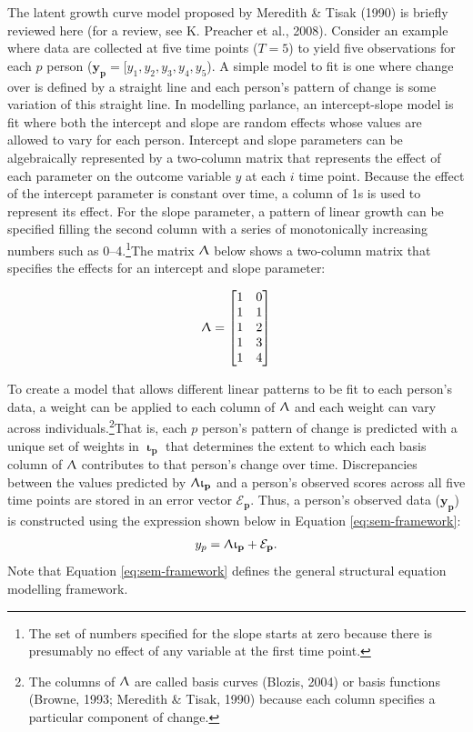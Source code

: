 \documentclass[
12pt, %
twoside,
english]{guelphthesis}
\theoremstyle{definition}
\theoremstyle{definition}
\theoremstyle{definition}
\theoremstyle{definition}
\theoremstyle{remark}
\begin{document}
The latent growth curve model proposed by Meredith \& Tisak (1990)
is briefly reviewed here (for a review, see K. Preacher et al., 2008). Consider an example where data are collected at five time
points (\(T = 5\)) to yield five observations for each \(p\) person
(\(\mathbf{y_p} = [y_1, y_2, y_3, y_4, y_5\)). A simple model to fit is
one where change over is defined by a straight line and each person's
pattern of change is some variation of this straight line. In modelling
parlance, an intercept-slope model is fit where both the intercept and
slope are random effects whose values are allowed to vary for each
person. Intercept and slope parameters can be algebraically represented
by a two-column matrix that represents the effect of each parameter on
the outcome variable \(y\) at each \(i\) time point. Because the effect of
the intercept parameter is constant over time, a column of 1s is used to
represent its effect. For the slope parameter, a pattern of linear
growth can be specified filling the second column with a series of
monotonically increasing numbers such as
0--4.\footnote{The set of numbers specified for the slope starts at zero because there is presumably no effect of any variable at the first time point.}The matrix \(\mathbf{\Uplambda}\) below shows a two-column matrix that
specifies the effects for an intercept and slope parameter:

\[ 
\mathbf{\Uplambda} = 
\begin{bmatrix}
1 & 0 \\ 
1 & 1 \\ 
1 & 2 \\ 
1 & 3 \\
1 & 4 \\
\end{bmatrix}
\]

\noindent To create a model that allows different linear patterns to be
fit to each person's data, a weight can be applied to each column of
\(\mathbf{\Uplambda}\) and each weight can vary across individuals.\footnote{The columns of $\mathbf{\Uplambda}$ are called basis curves (Blozis, 2004) or basis functions (Browne, 1993; Meredith \& Tisak, 1990) because each column specifies a particular component of change.}That is, each \(p\) person's pattern of change is predicted with a unique set of weights in \(\mathbf{\upiota_p}\) that determines the extent to
which each basis column of \(\mathbf{\Uplambda}\) contributes to that
person's change over time. Discrepancies between the values predicted by
\(\mathbf{\Uplambda\upiota_p}\) and a person's observed scores across all
five time points are stored in an error vector
\(\mathbf{\mathcal{E}_p}\). Thus, a person's observed data (\(\mathbf{y_p}\)) is
constructed using the expression shown below in Equation \ref{eq:sem-framework}:
\begin{align}
 y_p = \mathbf{\Uplambda\upiota_p} + \mathbf{\mathcal{E}_p}.
 \label{eq:sem-framework}
\end{align}
\noindent Note that Equation \ref{eq:sem-framework} defines the general structural equation modelling framework.
\end{document}
